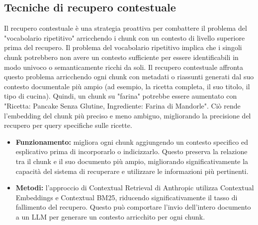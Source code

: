 \documentclass[a4paper, 11pt]{article}
\begin{document}
\subsection{Tecniche di recupero contestuale}
Il recupero contestuale è una strategia proattiva per combattere il problema del "vocabolario ripetitivo" arricchendo i chunk con un contesto di livello superiore prima del recupero. \cite{contextual_retrieval_pluralsight} Il problema del vocabolario ripetitivo implica che i singoli chunk potrebbero non avere un contesto sufficiente per essere identificabili in modo univoco o semanticamente ricchi da soli. \cite{contextual_retrieval_mlexpert} Il recupero contestuale affronta questo problema arricchendo ogni chunk con metadati o riassunti generati dal suo contesto documentale più ampio (ad esempio, la ricetta completa, il suo titolo, il tipo di cucina). Quindi, un chunk su "farina" potrebbe essere aumentato con "Ricetta: Pancake Senza Glutine, Ingrediente: Farina di Mandorle". Ciò rende l'embedding del chunk più preciso e meno ambiguo, migliorando la precisione del recupero per query specifiche sulle ricette.
\begin{itemize}
    \item \textbf{Funzionamento:} migliora ogni chunk aggiungendo un contesto specifico ed esplicativo prima di incorporarlo o indicizzarlo. \cite{contextual_retrieval_pluralsight} Questo preserva la relazione tra il chunk e il suo documento più ampio, migliorando significativamente la capacità del sistema di recuperare e utilizzare le informazioni più pertinenti.
    \item \textbf{Metodi:} l'approccio di Contextual Retrieval di Anthropic \cite{contextual_retrieval_mlexpert} utilizza Contextual Embeddings e Contextual BM25, riducendo significativamente il tasso di fallimento del recupero. Questo può comportare l'invio dell'intero documento a un LLM per generare un contesto arricchito per ogni chunk. \cite{contextual_retrieval_somawansa}
\end{itemize}
\end{document}
